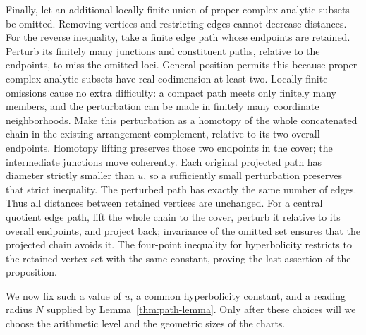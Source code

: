 Finally, let an additional locally finite union of proper complex
analytic subsets be omitted.  Removing vertices and restricting
edges cannot decrease distances.  For the reverse inequality,
take a finite edge path whose endpoints are retained.  Perturb
its finitely many junctions and constituent paths, relative to
the endpoints, to miss the omitted loci.  General position permits
this because proper complex analytic subsets have real codimension
at least two.  Locally finite omissions cause no extra difficulty:
a compact path meets only finitely many members, and the
perturbation can be made in finitely many coordinate neighborhoods.
Make this perturbation as a homotopy of the whole concatenated
chain in the existing arrangement complement, relative to its two
overall endpoints.  Homotopy lifting preserves those two endpoints
in the cover; the intermediate junctions move coherently.  Each
original projected path has diameter strictly smaller than $u$, so a
sufficiently small perturbation preserves that strict inequality.
The perturbed path has exactly the same number of edges.  Thus
all distances between retained vertices are unchanged.  For a
central quotient edge path, lift the whole chain to the cover, perturb it relative to its overall endpoints, and project
back; invariance of the omitted set ensures that the projected
chain avoids it.  The four-point inequality for hyperbolicity
restricts to the retained vertex set with the same constant, proving the
last assertion of the proposition.

We now fix such a value of $u$, a common hyperbolicity constant,
and a reading radius $N$ supplied by Lemma~\ref{thm:path-lemma}.
Only after these choices will we choose the arithmetic level and
the geometric sizes of the charts.
